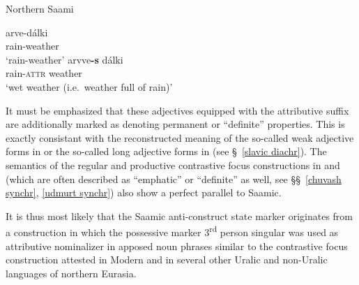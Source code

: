 {%
\begin{exe}
\ex
\begin{xlist}
\ex \rm{Northern Saami \citep[48]{bergsland1976}}
\begin{xlist}
\ex
\gll	arve-dálki\\
	rain-weather\\
\glt	‘rain-weather’
\ex
\gll	arvve\textbf{-s} dálki\\
	rain-\textsc{attr} weather\\
\glt	‘wet weather (i.e.~weather full of rain)’
\end{xlist}
\end{xlist}
\end{exe}
It must be emphasized that these adjectives equipped with the attributive suffix are additionally marked as denoting permanent or “definite” properties. This is exactly consistant with the reconstructed meaning of the so-called weak adjective forms in  or the so-called long adjective forms in  (see \S~\ref{slavic diachr}). The semantics of the regular and productive contrastive focus constructions in  and  (which are often described as “emphatic” or “definite” as well, see \S\S~\ref{chuvash synchr}, \ref{udmurt synchr}) also show a perfect parallel to Saamic. 

It is thus most likely that the Saamic anti-construct state marker originates from a construction in which the possessive marker 3\textsuperscript{rd} person singular was used as attributive nominalizer in apposed noun phrases similar to the contrastive focus construction attested in Modern  and in several other Uralic and non-Uralic languages of northern Eurasia.

}
